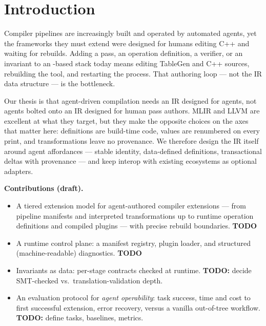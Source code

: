\section{Introduction}
\label{sec:intro}

Compiler pipelines are increasingly built and operated by automated agents, yet the
frameworks they must extend were designed for humans editing C++ and waiting for
rebuilds. Adding a pass, an operation definition, a verifier, or an invariant to an
\mlir{}-based stack today means editing TableGen and C++ sources, rebuilding the tool,
and restarting the process. That authoring loop --- not the IR data structure --- is
the bottleneck.

Our thesis is that agent-driven compilation needs an IR designed for agents, not
agents bolted onto an IR designed for human pass authors. MLIR and LLVM are excellent
at what they target, but they make the opposite choices on the axes that matter here:
definitions are build-time code, values are renumbered on every print, and
transformations leave no provenance. We therefore design the IR itself around agent
affordances --- stable identity, data-defined definitions, transactional deltas with
provenance --- and keep interop with existing ecosystems as optional adapters.

\textbf{Contributions (draft).}
\begin{itemize}
  \item A tiered extension model for agent-authored compiler extensions --- from
        pipeline manifests and interpreted transformations up to runtime operation
        definitions and compiled plugins --- with precise rebuild boundaries.
        {\color{red}\textbf{TODO}}
  \item A runtime control plane: a manifest registry, plugin loader, and structured
        (machine-readable) diagnostics.
        {\color{red}\textbf{TODO}}
  \item Invariants as data: per-stage contracts checked at runtime.
        {\color{red}\textbf{TODO:} decide SMT-checked vs.\ translation-validation depth.}
  \item An evaluation protocol for \emph{agent operability}: task success, time and
        cost to first successful extension, error recovery, versus a vanilla
        out-of-tree \mlir{} workflow.
        {\color{red}\textbf{TODO:} define tasks, baselines, metrics.}
\end{itemize}
